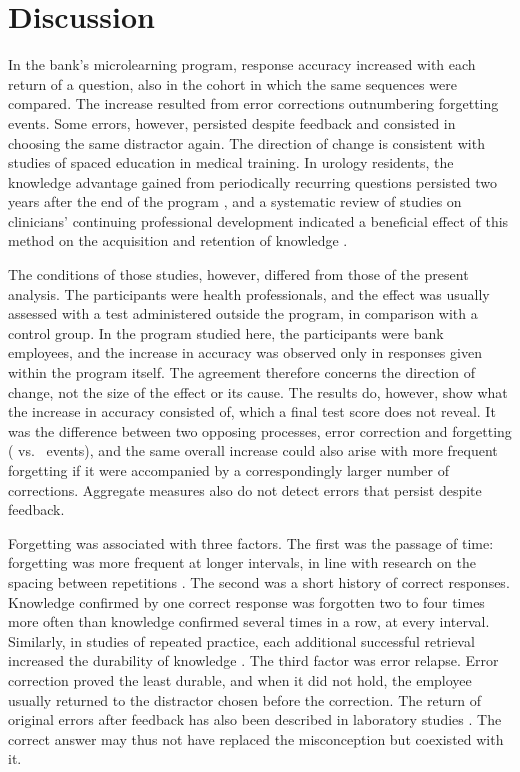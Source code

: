 \section{Discussion}

In the bank's microlearning program, response accuracy increased with each return of a question, also
in the cohort in which the same sequences were compared. The increase resulted from error corrections
outnumbering forgetting events. Some errors, however, persisted despite feedback and consisted in
choosing the same distractor again.
The direction of change is consistent with studies of spaced education in medical training.
In urology residents, the knowledge advantage gained from periodically recurring questions persisted
two years after the end of the program \citep{kerfoot2009}, and a systematic review of studies on
clinicians' continuing professional development indicated a beneficial effect of this method on the
acquisition and retention of knowledge \citep{phillips2019}.

The conditions of those studies, however, differed from those of the present analysis. The
participants were health professionals, and the effect was usually assessed with a test administered
outside the program, in comparison with a control group. In the program studied here, the participants
were bank employees, and the increase in accuracy was observed only in responses given within the
program itself. The agreement therefore concerns the direction of change, not the size of the effect or
its cause. The results do, however, show what the increase in accuracy consisted of, which a final test
score does not reveal. It was the difference between two opposing processes, error correction and
forgetting (\NCorrections{} vs.\ \NForgetting{} events), and the same overall increase could also
arise with more frequent forgetting if it were accompanied by a correspondingly larger number of
corrections. Aggregate measures also do not detect errors that persist despite feedback.

Forgetting was associated with three factors. The first was the passage of time: forgetting was more
frequent at longer intervals, in line with research on the spacing between repetitions
\citep{cepeda2006}. The second was a short history of correct responses. Knowledge confirmed by one
correct response was forgotten two to four times more often than knowledge confirmed several times in
a row, at every interval.
Similarly, in studies of repeated practice, each additional successful retrieval increased the
durability of knowledge \citep{rawson2013}. The third factor was error relapse. Error correction proved
the least durable, and when it did not hold, the employee usually returned to the distractor chosen
before the correction. The return of original errors after feedback has also been described in
laboratory studies \citep{butler2011}. The correct answer may thus not have replaced the misconception
but coexisted with it.

